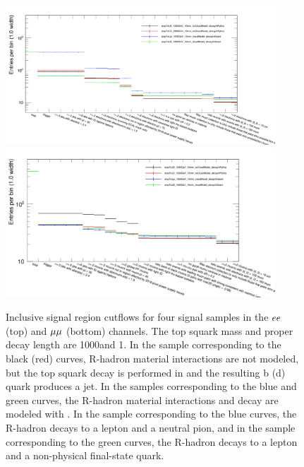 \begin{figure}
\centering
\includegraphics[width=0.9\textwidth]{figures/r_hadrons/ee_cutFlows_lb_ld_lpi_l_1000GeV_10mm.pdf}
\includegraphics[width=0.9\textwidth]{figures/r_hadrons/mumu_cutFlows_lb_ld_lpi_l_1000GeV_10mm.pdf}
\caption{
Inclusive signal region cutflows for four signal samples  in the $ee$ (top) and ${\mu}{\mu}$ (bottom) channels. The top squark mass and proper decay length are 1000\GeV and 1\cm. In the sample corresponding to the black (red) curves, R-hadron material interactions are not modeled, but the top squark decay is performed in \PYTHIA and the resulting b (d) quark produces a jet. In the samples corresponding to the blue and green curves, the R-hadron material interactions and decay are modeled with \GEANTfour. In the sample corresponding to the blue curves, the R-hadron decays to a lepton and a neutral pion, and in the sample corresponding to the green curves, the R-hadron decays to a lepton and a non-physical final-state quark.
}
\label{r_hadron_cutflows}
\end{figure}